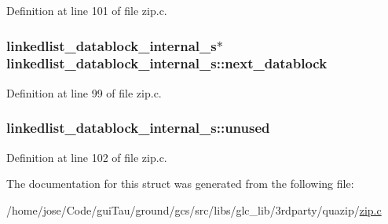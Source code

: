 Definition at line 101 of file zip.\-c.

\hypertarget{structlinkedlist__datablock__internal__s_a1f5abadbf41d82b8724a048a33c4c153}{
\subsubsection[{next\-\_\-datablock}]{ {\bf linkedlist\-\_\-datablock\-\_\-internal\-\_\-s}$\ast$ linkedlist\-\_\-datablock\-\_\-internal\-\_\-s\-::next\-\_\-datablock}}\label{structlinkedlist__datablock__internal__s_a1f5abadbf41d82b8724a048a33c4c153}


Definition at line 99 of file zip.\-c.

\hypertarget{structlinkedlist__datablock__internal__s_ae7275ad9d24cbe4f4c062f29abfb3b91}{
\subsubsection[{unused}]{ linkedlist\-\_\-datablock\-\_\-internal\-\_\-s\-::unused}}\label{structlinkedlist__datablock__internal__s_ae7275ad9d24cbe4f4c062f29abfb3b91}


Definition at line 102 of file zip.\-c.



The documentation for this struct was generated from the following file\-:\begin{DoxyCompactItemize}
\item 
/home/jose/\-Code/gui\-Tau/ground/gcs/src/libs/glc\-\_\-lib/3rdparty/quazip/\hyperlink{zip_8c}{zip.\-c}\end{DoxyCompactItemize}
